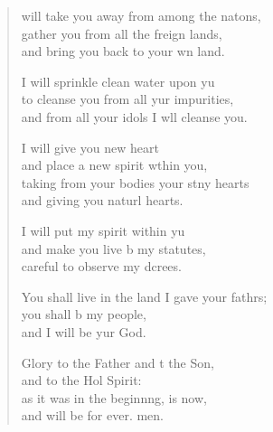 \begin{verse}
  \begin{patverse}
 will take you away from among the nat\pointup{\i}ons,\Flex\\
gather you from all the freign lands,\Med\\
and bring you back to your wn land.

I will sprinkle clean water upon yu\Flex\\
to cleanse you from all yur impurities,\Med\\
and from all your idols I w\pointup{\i}ll cleanse you.

I will give you  new heart\Med\\
and place a new spirit w\pointup{\i}thin you,\\
taking from your bodies your stny hearts\Med\\
and giving you naturl hearts.

I will put my spirit within yu\Flex\\
and make you live b my statutes,\Med\\
careful to observe my dcrees.

You shall live in the land I gave your fathrs;\Flex\\
you shall b my people,\Med\\
and I will be yur God.

Glory to the Father and t the Son,\Med\\
and to the Hol Spirit:\\
as it was in the beginn\pointup{\i}ng, is now,\Med\\
and will be for ever. men.
  \end{patverse}
  \end{verse}
